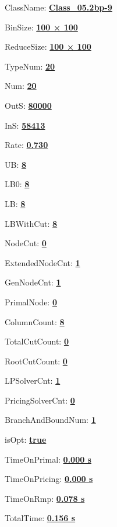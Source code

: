 \documentclass[11pt]{article}
\begin{document}
\pagestyle{empty}


ClassName: \underline{\textbf{Class_05.2bp-9}}
\par
BinSize: \underline{\textbf{100 × 100}}
\par
ReduceSize: \underline{\textbf{100 × 100}}
\par
TypeNum: \underline{\textbf{20}}
\par
Num: \underline{\textbf{20}}
\par
OutS: \underline{\textbf{80000}}
\par
InS: \underline{\textbf{58413}}
\par
Rate: \underline{\textbf{0.730}}
\par
UB: \underline{\textbf{8}}
\par
LB0: \underline{\textbf{8}}
\par
LB: \underline{\textbf{8}}
\par
LBWithCut: \underline{\textbf{8}}
\par
NodeCut: \underline{\textbf{0}}
\par
ExtendedNodeCnt: \underline{\textbf{1}}
\par
GenNodeCnt: \underline{\textbf{1}}
\par
PrimalNode: \underline{\textbf{0}}
\par
ColumnCount: \underline{\textbf{8}}
\par
TotalCutCount: \underline{\textbf{0}}
\par
RootCutCount: \underline{\textbf{0}}
\par
LPSolverCnt: \underline{\textbf{1}}
\par
PricingSolverCnt: \underline{\textbf{0}}
\par
BranchAndBoundNum: \underline{\textbf{1}}
\par
isOpt: \underline{\textbf{true}}
\par
TimeOnPrimal: \underline{\textbf{0.000 s}}
\par
TimeOnPricing: \underline{\textbf{0.000 s}}
\par
TimeOnRmp: \underline{\textbf{0.078 s}}
\par
TotalTime: \underline{\textbf{0.156 s}}
\par
\newpage


\end{document}
